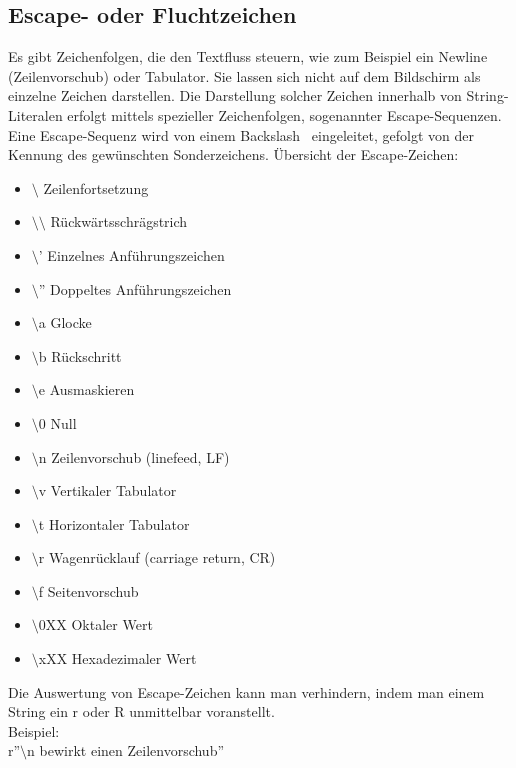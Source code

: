 \subsection{Escape- oder Fluchtzeichen}
Es gibt Zeichenfolgen, die den Textfluss steuern, wie zum Beispiel ein Newline (Zeilenvorschub) oder Tabulator. Sie lassen sich nicht auf dem Bildschirm als einzelne Zeichen darstellen. Die Darstellung solcher Zeichen innerhalb von String-Literalen erfolgt mittels spezieller Zeichenfolgen, sogenannter Escape-Sequenzen. Eine Escape-Sequenz wird von einem Backslash \ eingeleitet, gefolgt von der Kennung des gewünschten Sonderzeichens. Übersicht der Escape-Zeichen:
\\
\begin{itemize}
\item $\setminus$ Zeilenfortsetzung 
\item $\setminus\setminus$ Rückwärtsschrägstrich 
\item $\setminus$' Einzelnes Anführungszeichen 
\item $\setminus$'' Doppeltes Anführungszeichen
\item $\setminus$a Glocke
\item $\setminus$b Rückschritt
\item $\setminus$e Ausmaskieren
\item $\setminus$0 Null
\item $\setminus$n Zeilenvorschub (linefeed, LF)
\item $\setminus$v Vertikaler Tabulator
\item $\setminus$t Horizontaler Tabulator
\item $\setminus$r Wagenrücklauf (carriage return, CR)
\item $\setminus$f Seitenvorschub
\item $\setminus$0XX Oktaler Wert
\item $\setminus$xXX Hexadezimaler Wert 
\end{itemize}
Die Auswertung von Escape-Zeichen kann man verhindern, indem man einem String ein r oder R unmittelbar voranstellt. \\
Beispiel: \\
r''$\setminus$n bewirkt einen Zeilenvorschub''

